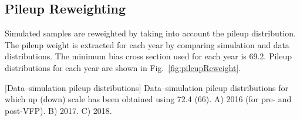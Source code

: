 \subsection{Pileup Reweighting}
Simulated samples are reweighted by taking into account the pileup distribution.
The pileup weight is extracted for each year by comparing simulation and data distributions.
The minimum bias cross section used for each year is 69.2\mb.
Pileup distributions for each year are shown in Fig.~\ref{fig:pileupReweight}.
\begin{multiFigure}
    \centering
        [Data--simulation pileup distributions] %
        {Data--simulation pileup distributions for which up (down) scale has been obtained using 72.4 (66)\mb. %
        \;A) 2016 (for pre- and post-VFP).
        \;B) 2017.
        \;C) 2018.
        } 
    \label{fig:pileupReweight}
\end{multiFigure}
